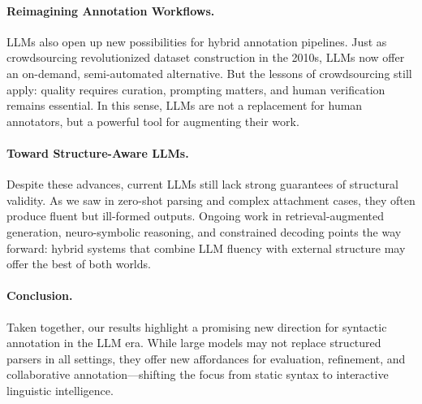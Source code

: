 \paragraph{Reimagining Annotation Workflows.}
LLMs also open up new possibilities for hybrid annotation pipelines. Just as crowdsourcing revolutionized dataset construction in the 2010s, LLMs now offer an on-demand, semi-automated alternative. But the lessons of crowdsourcing still apply: quality requires curation, prompting matters, and human verification remains essential. In this sense, LLMs are not a replacement for human annotators, but a powerful tool for augmenting their work.

\paragraph{Toward Structure-Aware LLMs.}
Despite these advances, current LLMs still lack strong guarantees of structural validity. As we saw in zero-shot parsing and complex attachment cases, they often produce fluent but ill-formed outputs. Ongoing work in retrieval-augmented generation, neuro-symbolic reasoning, and constrained decoding points the way forward: hybrid systems that combine LLM fluency with external structure may offer the best of both worlds.

\paragraph{Conclusion.}
Taken together, our results highlight a promising new direction for syntactic annotation in the LLM era. While large models may not replace structured parsers in all settings, they offer new affordances for evaluation, refinement, and collaborative annotation—shifting the focus from static syntax to interactive linguistic intelligence.
